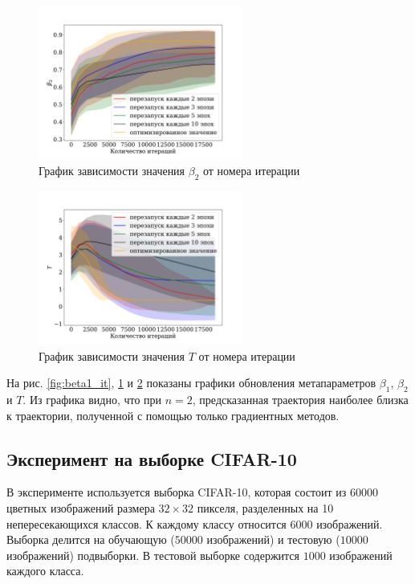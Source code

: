 \documentclass[12pt, twoside]{article}
\begin{document}
\begin{figure}[!ht]
    \centering
    \includegraphics[width=0.6\textwidth]{beta2_iter.pdf}
    \caption{График зависимости значения $\beta_2$ от номера итерации}
    \label{fig:beta2_it}
\end{figure}

\begin{figure}[!ht]
    \centering
    \includegraphics[width=0.6\textwidth]{temp_iter.pdf}
    \caption{График зависимости значения $T$ от номера итерации}
    \label{fig:temp_it}
\end{figure}

На рис. \ref{fig:beta1_it}, \ref{fig:beta2_it} и \ref{fig:temp_it} показаны графики обновления метапараметров $\beta_1$, $\beta_2$ и $T$. Из графика видно, что при $n=2$, предсказанная траектория наиболее близка к траектории, полученной с помощью только градиентных методов.

\subsection{Эксперимент на выборке CIFAR-10}
В эксперименте используется выборка CIFAR-10, которая состоит из $60000$ цветных изображений размера $32 \times 32$ пикселя, разделенных на 10 непересекающихся классов. К каждому классу относится $6000$ изображений. Выборка делится на обучающую ($50000$ изображений) и тестовую ($10000$ изображений) подвыборки. В тестовой выборке содержится $1000$ изображений каждого класса.
\end{document}
